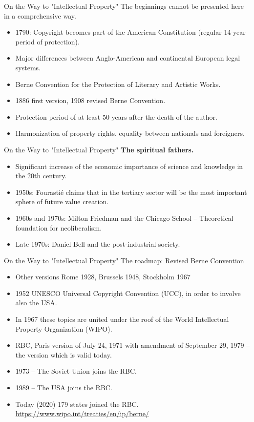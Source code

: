 \documentclass{beamer}
\begin{document}
\begin{frame}{On the Way to "Intellectual Property"}
The beginnings cannot be presented here in a comprehensive way.
\begin{itemize}
\item 1790: Copyright becomes part of the American Constitution (regular
  14-year period of protection).
\item Major differences between Anglo-American and continental European legal
  systems. 
\item Berne Convention for the Protection of Literary and Artistic Works.
\item 1886 first version, 1908 revised Berne Convention.
\item Protection period of at least 50 years after the death of the author. 
\item Harmonization of property rights, equality between nationals and
  foreigners.
\end{itemize}
\end{frame}

\begin{frame}{On the Way to "Intellectual Property"}
\textbf{The spiritual fathers.}
\begin{itemize}
\item Significant increase of the economic importance of science and knowledge
  in the 20th century.
\item 1950s: Fourastié claims that in the tertiary sector will be the most
  important sphere of future value creation.
\item 1960s and 1970s: Milton Friedman and the Chicago School -- Theoretical
  foundation for neoliberalism.
\item Late 1970s: Daniel Bell and the post-industrial society.
\end{itemize}
\end{frame}

\begin{frame}{On the Way to "Intellectual Property"}
The roadmap: Revised Berne Convention
\begin{itemize}
\item Other versions Rome 1928, Brussels 1948, Stockholm 1967
\item 1952 UNESCO Universal Copyright Convention (UCC), in order to involve
  also the USA.
\item In 1967 these topics are united under the roof of the World Intellectual
  Property Organization (WIPO).
\item RBC, Paris version of July 24, 1971 with amendment of September 29, 1979
  -- the version which is valid today.
\item 1973 -- The Soviet Union joins the RBC.
\item 1989 -- The USA joins the RBC.
\item Today (2020) 179 states joined the RBC.\\
  \url{https://www.wipo.int/treaties/en/ip/berne/}
\end{itemize}
\end{frame}
\end{document}
